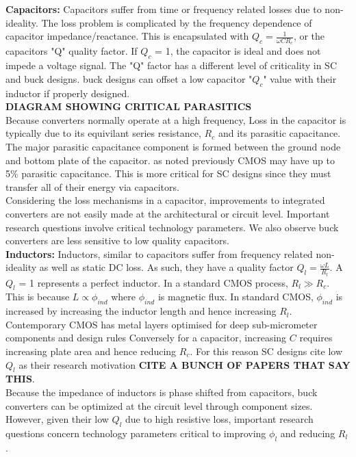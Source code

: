 \documentclass[letterpaper,twocolumn,10pt]{article}
\begin{document}
\textbf{Capacitors: }
Capacitors suffer from time or frequency related losses due to non-ideality. The loss problem is complicated by the frequency dependence of capacitor impedance/reactance. This is encapsulated with $Q_c=\frac{1}{\omega CR_c}$, or the capacitors "Q" quality factor. If $Q_c$ = 1, the capacitor is ideal and does not impede a voltage signal. The "Q" factor has a different level of criticality in SC and buck designs. buck designs can offset a low capacitor "$Q_c$" value with their inductor if properly designed.\\
\textbf{DIAGRAM SHOWING CRITICAL PARASITICS}\\
Because converters normally operate at a high frequency, Loss in the capacitor is typically due to its equivilant series resistance, $R_c$ and its parasitic capacitance. The major parasitic capacitance component is formed between the ground node and bottom plate of the capacitor\cite{Damak2013}. as noted previously CMOS may have up to 5\% parasitic capacitance. This is more critical for SC designs since they must transfer all of their energy via capacitors.\\
\indent Considering the loss mechanisms in a capacitor, improvements to integrated converters are not easily made at the architectural or circuit level. Important research questions involve critical technology parameters. We also observe buck converters are less sensitive to low quality capacitors.\\
\textbf{Inductors: }Inductors, similar to capacitors suffer from frequency related non-ideality as well as static DC loss. As such, they have a quality factor $Q_l = \frac{\omega L}{R_l}$. A $Q_l$ = 1 represents a perfect inductor. In a standard CMOS process, $R_l \gg R_c$. This is because $L \propto \phi_{ind}$ where $\phi_{ind}$ is magnetic flux. In standard CMOS, $\phi_{ind}$ is increased by increasing the inductor length and hence increasing $R_l$. Contemporary CMOS has metal layers optimised for deep sub-micrometer components and design rules  Conversely for a capacitor, increasing $C$ requires increasing plate area and hence reducing $R_c$. For this reason SC designs cite low $Q_l$ as their research motivation \textbf{CITE A BUNCH OF PAPERS THAT SAY THIS}.\\
\indent Because the impedance of inductors is phase shifted from capacitors, buck converters can be optimized at the circuit level through component sizes. However, given their low $Q_l$ due to high resistive loss, important research questions concern technology parameters critical to improving $\phi_l$ and reducing $R_l$.\\    
\end{document}
